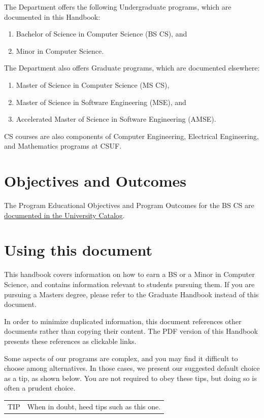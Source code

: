 \documentclass{book}
\newcommand{\campusname}{CSUF}
\newenvironment{tip}
               {\tcolorbox \begin{tabular}{m{.5in} m{5in}} \Large{TIP} & }
               {\end{tabular} \endtcolorbox}
\begin{document}
The Department offers the following Undergraduate programs, which are documented in this Handbook:
\begin{enumerate}
\item Bachelor of Science in Computer Science (BS CS), and
\item Minor in Computer Science.
\end{enumerate}

The Department also offers Graduate programs, which are documented elsewhere:
\begin{enumerate}
\item Master of Science in Computer Science (MS CS),
\item Master of Science in Software Engineering (MSE), and
\item Accelerated Master of Science in Software Engineering (AMSE).
\end{enumerate}

CS courses are also components of Computer Engineering, Electrical Engineering, and Mathematics programs at \campusname.

\section{Objectives and Outcomes}
 
The Program Educational Objectives and Program Outcomes for the BS CS are \href{http://catalog.fullerton.edu/preview_entity.php?catoid=2&ent_oid=113&returnto=137#Learning_Goals_and_Student_Learning_Outcomes}{documented in the University Catalog}.

\section{Using this document}

This handbook covers information on how to earn a BS or a Minor in Computer Science, and contains information relevant to students pursuing them. If you are pursuing a Masters degree, please refer to the Graduate Handbook instead of this document.

In order to minimize duplicated information, this document references other documents rather than copying their content. The PDF version of this Handbook presents these references as clickable links.

Some aspects of our programs are complex, and you may find it difficult to choose among alternatives. In those cases, we present our suggested default choice as a tip, as shown below. You are not required to obey these tips, but doing so is often a prudent choice.
\begin{tip}
When in doubt, heed tips such as this one.
\end{tip}
\end{document}
